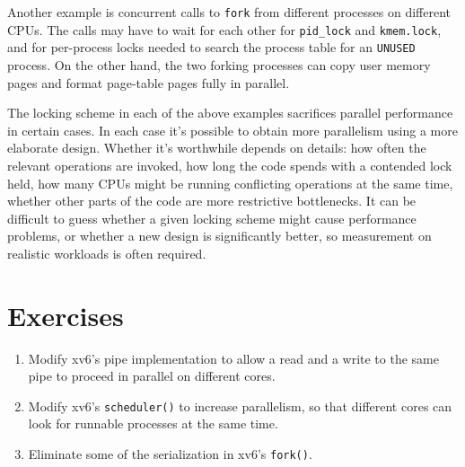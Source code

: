 Another example is concurrent calls to {\tt fork} from different
processes on different CPUs. The calls may have to wait for each other
for {\tt pid\_lock} and {\tt kmem.lock}, and for per-process locks
needed to search the process table for an {\tt UNUSED} process. On the
other hand, the two forking processes can copy user memory pages and
format page-table pages fully in parallel.

The locking scheme in each of the above examples sacrifices parallel
performance in certain cases. In each case it's possible to obtain
more parallelism using a more elaborate design. Whether it's
worthwhile depends on details: how often the relevant operations are
invoked, how long the code spends with a contended lock held, how many
CPUs might be running conflicting operations at the same time, whether
other parts of the code are more restrictive bottlenecks. It can be
difficult to guess whether a given locking scheme might cause
performance problems, or whether a new design is significantly better,
so measurement on realistic workloads is often required.

\section{Exercises}

\begin{enumerate}

\item Modify xv6's pipe implementation to allow a read and
  a write to the same pipe to proceed in parallel on different cores.

\item Modify xv6's \texttt{scheduler()} to increase parallelism,
  so that different cores can look for runnable processes at the same time.

\item Eliminate some of the serialization in xv6's \texttt{fork()}.

\end{enumerate}

